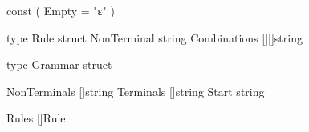 const (
	Empty = "ε"
)

type Rule struct {
	NonTerminal  string
	Combinations [][]string
}

type Grammar struct {
	NonTerminals []string
	Terminals    []string
	Start        string

	Rules []Rule
}